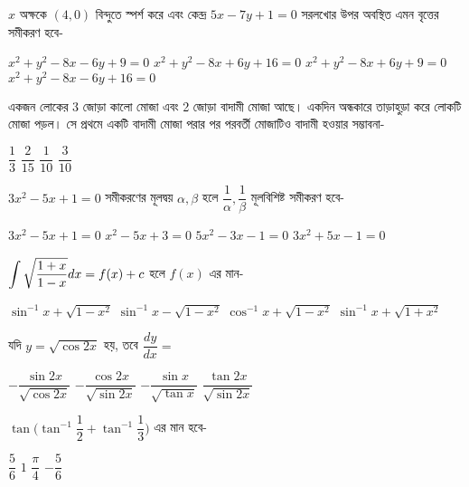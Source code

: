 \documentclass[addpoints]{exam}
\begin{document}
\begin{questions}
\begin{oneparchoices}
\end{oneparchoices}

\question  $ x $ অক্ষকে $ (4,0) $ বিন্দুতে স্পর্শ করে এবং কেন্দ্র $ 5x-7y+1=0 $ সরলখোর উপর অবস্থিত এমন বৃত্তের সমীকরণ হবে-

\begin{oneparchoices}
\choice $ x^{2}+y^{2}-8x-6y+9=0 $
\choice $ x^{2}+y^{2}-8x+6y+16=0 $
\choice $ x^{2}+y^{2}-8x+6y+9=0 $
\choice $ x^{2}+y^{2}-8x-6y+16=0 $

\end{oneparchoices}

\question একজন লোকের 3 জোড়া কালো মোজা এবং 2 জোড়া বাদামী মোজা আছে। একদিন অন্ধকারে তাড়াহুড়া করে লোকটি মোজা পড়ল। সে প্রথমে একটি বাদামী মোজা পরার পর পরবর্তী মোজাটিও বাদামী হওয়ার সম্ভাবনা-

\begin{oneparchoices}
\choice $ \dfrac{1}{3} $
\choice $ \dfrac{2}{15} $
\choice $ \dfrac{1}{10} $
\choice $ \dfrac{3}{10} $
\end{oneparchoices}

\question $ 3x^{2}-5x+1=0 $ সমীকরণের মূলদ্বয় $ \alpha, \beta $ হলে $ \dfrac{1}{\alpha}, \dfrac{1}{\beta} $ মূলবিশিষ্ট সমীকরণ হবে-

\begin{oneparchoices}
\choice $ 3x^{2}-5x+1=0 $
\choice $ x^{2}-5x+3=0 $
\choice $ 5x^{2}-3x-1=0 $
\choice $ 3x^{2}+5x-1=0 $
\end{oneparchoices}


\question $ \mathlarger{\int\sqrt{\dfrac{1+x}{1-x}}dx = f(x)+c} $ হলে $ f(x) $ এর মান-

\begin{oneparchoices}
\choice $ \sin^{-1}x + \sqrt{1-x^{2}} $
\choice $ \sin^{-1}x - \sqrt{1-x^{2}} $
\choice $ \cos^{-1}x + \sqrt{1-x^{2}} $
\choice $ \sin^{-1}x + \sqrt{1+x^{2}} $
\end{oneparchoices}

\question যদি $ y = \sqrt{\cos 2x} $ হয়, তবে $ \dfrac{dy}{dx} = $ 

\begin{oneparchoices}
\choice $ -\dfrac{\sin 2x}{\sqrt{\cos 2x}}  $
\choice $ -\dfrac{\cos 2x}{\sqrt{\sin 2x}}  $
\choice $ -\dfrac{\sin x}{\sqrt{\tan x}}  $
\choice $ \dfrac{\tan 2x}{\sqrt{\sin 2x}}  $
\end{oneparchoices}

\question $ \tan \Big(\tan^{-1}\dfrac{1}{2} + \tan^{-1}\dfrac{1}{3} \Big) $ এর মান হবে-

\begin{oneparchoices}
\choice $ \dfrac{5}{6} $
\choice $ 1 $
\choice $ \dfrac{\pi}{4} $
\choice $ - \dfrac{5}{6}$


\end{oneparchoices}
\end{questions}
\end{document}
